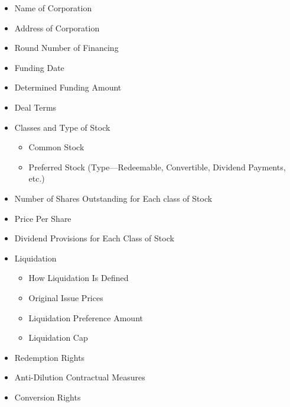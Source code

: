 \documentclass[
]{WileySix}
\providecommand{\tightlist}{%
  \setlength{\itemsep}{0pt}\setlength{\parskip}{0pt}}
\begin{document}
\begin{itemize}
\tightlist
\item
  Name of Corporation\\
\item
  Address of Corporation\\
\item
  Round Number of Financing\\
\item
  Funding Date\\
\item
  Determined Funding Amount\\
\item
  Deal Terms\\
\item
  Classes and Type of Stock

  \begin{itemize}
  \tightlist
  \item
    Common Stock\\
  \item
    Preferred Stock (Type---Redeemable, Convertible, Dividend Payments, etc.)\\
  \end{itemize}
\item
  Number of Shares Outstanding for Each class of Stock\\
\item
  Price Per Share\\
\item
  Dividend Provisions for Each Class of Stock\\
\item
  Liquidation

  \begin{itemize}
  \tightlist
  \item
    How Liquidation Is Defined\\
  \item
    Original Issue Prices\\
  \item
    Liquidation Preference Amount\\
  \item
    Liquidation Cap\\
  \end{itemize}
\item
  Redemption Rights\\
\item
  Anti-Dilution Contractual Measures\\
\item
  Conversion Rights


\end{itemize}
\end{document}
